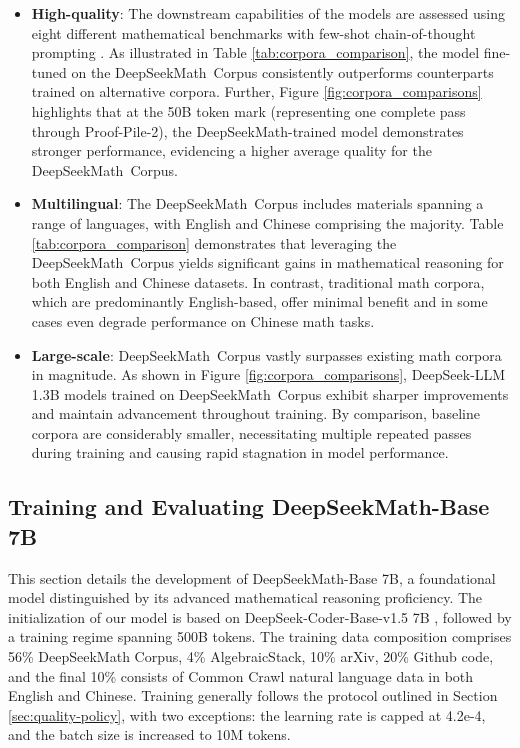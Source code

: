 \begin{itemize}[topsep=0pt]
    \item \textbf{High-quality}: 
    The downstream capabilities of the models are assessed using eight different mathematical benchmarks with few-shot chain-of-thought prompting \cite{cot}. As illustrated in Table \ref{tab:corpora_comparison}, the model fine-tuned on the DeepSeekMath~Corpus consistently outperforms counterparts trained on alternative corpora. Further, Figure \ref{fig:corpora_comparisons} highlights that at the 50B token mark (representing one complete pass through Proof-Pile-2), the DeepSeekMath-trained model demonstrates stronger performance, evidencing a higher average quality for the DeepSeekMath~Corpus.
    \item \textbf{Multilingual}: 
    The DeepSeekMath~Corpus includes materials spanning a range of languages, with English and Chinese comprising the majority. Table \ref{tab:corpora_comparison} demonstrates that leveraging the DeepSeekMath~Corpus yields significant gains in mathematical reasoning for both English and Chinese datasets. In contrast, traditional math corpora, which are predominantly English-based, offer minimal benefit and in some cases even degrade performance on Chinese math tasks.
    \item \textbf{Large-scale}: 
    DeepSeekMath~Corpus vastly surpasses existing math corpora in magnitude. As shown in Figure \ref{fig:corpora_comparisons}, DeepSeek-LLM 1.3B models trained on DeepSeekMath~Corpus exhibit sharper improvements and maintain advancement throughout training. By comparison, baseline corpora are considerably smaller, necessitating multiple repeated passes during training and causing rapid stagnation in model performance.
\end{itemize}

\subsection{Training and Evaluating DeepSeekMath-Base 7B}

This section details the development of DeepSeekMath-Base 7B, a foundational model distinguished by its advanced mathematical reasoning proficiency. The initialization of our model is based on DeepSeek-Coder-Base-v1.5 7B \citep{deepseek-coder}, followed by a training regime spanning 500B tokens. The training data composition comprises 56\% DeepSeekMath Corpus, 4\% AlgebraicStack, 10\% arXiv, 20\% Github code, and the final 10\% consists of Common Crawl natural language data in both English and Chinese. Training generally follows the protocol outlined in Section \ref{sec:quality-policy}, with two exceptions: the learning rate is capped at 4.2e-4, and the batch size is increased to 10M tokens.

